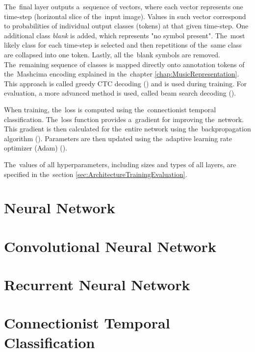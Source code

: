 The~final layer outputs a~sequence of vectors, where each vector represents one time-step (horizontal slice of the~input image). Values in such vector correspond to probabilities of individual output classes (tokens) at that given time-step. One additional class \emph{blank} is added, which represents "no symbol present". The~most likely class for each time-step is selected and then repetitions of the~same class are collapsed into one token. Lastly, all the~blank symbols are removed. The~remaining sequence of classes is mapped directly onto annotation tokens of the~Mashcima encoding explained in the~chapter \ref{chap:MusicRepresentation}. This approach is called greedy CTC decoding (\cite{CTC}) and is used during training. For evaluation, a more advanced method is used, called beam search decoding (\cite{CtcBeamSearch}).

When training, the~loss is computed using the~connectionist temporal classification. The~loss function provides a~gradient for improving the~network. This gradient is then calculated for the~entire network using the~backpropagation algorithm (\cite{Goodfellow-et-al-2016}). Parameters are then updated using the~adaptive learning rate optimizer (Adam) (\cite{AdamOptimizer}).

The~values of all hyperparameters, including sizes and types of all layers, are specified in the~section \ref{sec:ArchitectureTrainingEvaluation}.


\section{Neural Network}


\section{Convolutional Neural Network}


\section{Recurrent Neural Network}


\section{Connectionist Temporal Classification}
